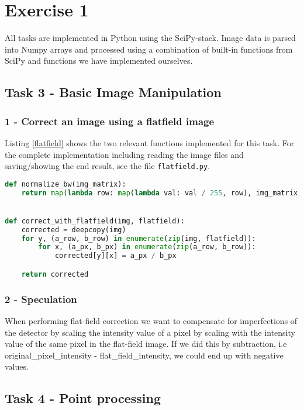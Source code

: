 \chapter{Exercise 1}

All tasks are implemented in Python using the SciPy-stack.
Image data is parsed into Numpy arrays and processed using a combination of built-in functions from SciPy and functions we have implemented ourselves.

\section*{Task 3 - Basic Image Manipulation}

\subsection*{1 - Correct an image using a flatfield image}

Listing \ref{flatfield} shows the two relevant functions implemented for this task.
For the complete implementation including reading the image files and saving/showing the end result, see the file \texttt{flatfield.py}.

\begin{lstlisting}[language=Python, label=flatfield, caption=Flatfield image correction]
def normalize_bw(img_matrix):
    return map(lambda row: map(lambda val: val / 255, row), img_matrix)


def correct_with_flatfield(img, flatfield):
    corrected = deepcopy(img)
    for y, (a_row, b_row) in enumerate(zip(img, flatfield)):
        for x, (a_px, b_px) in enumerate(zip(a_row, b_row)):
            corrected[y][x] = a_px / b_px

    return corrected
\end{lstlisting}

\subsection*{2 - Speculation}

When performing flat-field correction we want to compensate for imperfections of the detector by scaling the intensity value of a pixel by scaling with the intensity value of the same pixel in the flat-field image.
If we did this by subtraction, i.e original\_pixel\_intensity - flat\_field\_intensity, we could end up with negative values.


\section*{Task 4 - Point processing}

